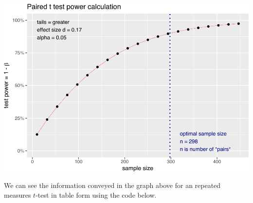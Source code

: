 \documentclass[
]{krantz}
\begin{document}
\includegraphics{bookdown_files/figure-latex/unnamed-chunk-250-1.pdf}

We can see the information conveyed in the graph above for an repeated measures \(t\)-test in table form using the code below.
\end{document}
